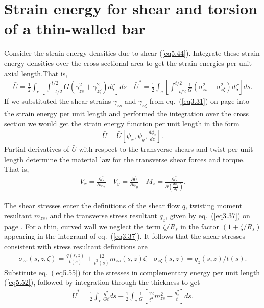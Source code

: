\documentclass{AeroStructure-ERJohnson}
\begin{document}
\section{Strain energy for shear and torsion of a thin-walled bar}\label{sec5.5}

Consider the strain energy densities due to shear (\ref{eq5.44}). Integrate these strain energy densities over the cross-sectional area to get the strain energies per unit axial length.That is,
\begin{align}\label{eq5.52}
\bar{U}=\frac{1}{2} \int_{c}\left[\int_{-t / 2}^{t / 2} G(\gamma_{z s}^{2}+\gamma_{z \zeta}^{2}) d \zeta\right] d s \quad \bar{U}^{*}=\frac{1}{2} \int_{c}\left[\int_{-t / 2}^{t / 2} \frac{1}{G}(\sigma_{z s}^{2}+\sigma_{z \zeta}^{2}) d \zeta\right] d s.
\end{align}
If we substituted the shear strains $\gamma_{z s}$ and $\gamma_{z \zeta}$ from eq.~(\ref{eq3.31}) on page \pageref{eq3.31} into the strain energy per unit length and performed the integration over the cross section we would get the strain energy function per unit length in the form
\begin{align}\label{eq5.53}
\bar{U}=\bar{U}\left[\psi_{x}, \psi_{y}, \frac{d \phi_{z}}{d z}\right].
\end{align}
Partial derivatives of $\bar{U}$ with respect to the transverse shears and twist per unit length determine the material law for the transverse shear forces and torque. That is,
\begin{align}\label{eq5.54}
V_{x}=\frac{\partial \bar{U}}{\partial \psi_{x}} \quad V_{y}=\frac{\partial \bar{U}}{\partial \psi_{y}} \quad M_{z}=\frac{\partial \bar{U}}{\partial\left(\frac{d \phi_{z}}{d_{z}}\right)}.
\end{align}

The shear stresses enter the definitions of the shear flow $q$, twisting moment resultant $m_{zs}$, and the transverse stress resultant $q_z$, given by eq.~(\ref{eq3.37}) on page \pageref{eq3.37}. For a thin, curved wall we neglect the term $\zeta / R_{s}$ in the factor $\left(1+\zeta / R_{s}\right)$ appearing in the integrand of eq.~(\ref{eq3.37}). It follows that the shear stresses consistent with stress resultant definitions are
\begin{align}\label{eq5.55}
\sigma_{z s}(s, z, \zeta)=\frac{q(s, z)}{t(s)}+\frac{12}{t^{3}(s)} m_{z s}(s, z) \zeta \quad \sigma_{z \zeta}(s, z)=q_{z}(s, z) / t(s).
\end{align}
Substitute eq.~(\ref{eq5.55}) for the stresses in complementary energy per unit length (\ref{eq5.52}), followed by integration through the thickness to get
\begin{align}\label{eq5.56}
\bar{U}^{*}=\frac{1}{2} \int_{c} \frac{q^{2}}{G t} d s+\frac{1}{2} \int_{c} \frac{1}{G}\left[\frac{12}{t^{3}} m_{z s}^{2}+\frac{q_{z}^{2}}{t}\right] d s.
\end{align}
\end{document}
